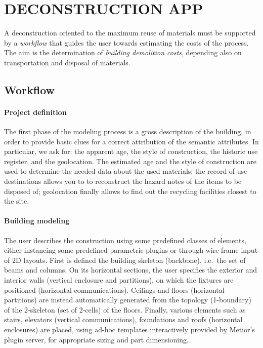 \section{\uppercase{Deconstruction App}}
\label{sec:application}

\noindent
A deconstruction oriented to the maximum reuse of materials must be supported by a \emph{workflow} that guides the user towards estimating the costs of the process. The aim is the determination of  \emph{building demolition costs}, depending also on transportation  and disposal of materials.

\vspace{-3mm}\subsection{Workflow}\vspace{-3mm}

\paragraph{Project definition} 

The first phase of the modeling process is a gross description of the building, in order to provide basic clues for a correct attribution of the semantic attributes.
In particular, we ask for: the apparent age, the style of construction, the historic use register, and the geolocation.
The estimated age and the style of construction are used to determine the needed data about the used materials; the record of use destinations allows you to to reconstruct the hazard notes of the items to be disposed of; geolocation finally allows to find out the recycling facilities closest to the site.

\vspace{-2mm}\paragraph{Building modeling} 
The user describes the construction using some predefined classes of elements, either instancing some  predefined parametric plugins or through wire-frame input of 2D layouts. 
First is defined the building skeleton (backbone), i.e.~the set of beams and columns.
On its horizontal sections, the user specifies the exterior and interior walls (vertical enclosure and partitions), on which the fixtures are positioned (horizontal communications).
Ceilings and floors (horizontal partitions) are instead automatically generated from the topology (1-boundary) of the 2-skeleton (set of 2-cells) of the floors.
Finally, various elements such as stairs, elevators (vertical communications), foundations and roofs (horizontal enclosures) are placed, using ad-hoc templates interactively provided by Metior's plugin server, for appropriate sizing and part dimensioning.

